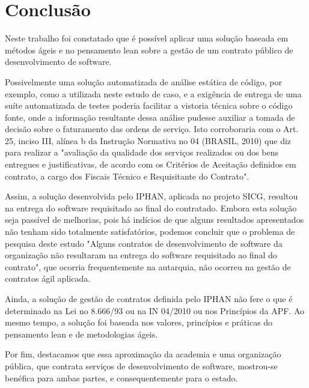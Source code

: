 \section{Conclusão}
\label{sec:conclusao}


Neste trabalho foi constatado que é possível aplicar uma solução baseada em métodos ágeis e no pensamento lean sobre a gestão de um contrato público de desenvolvimento de software.

Possivelmente uma solução automatizada de análise estática de código, por exemplo, como a utilizada neste estudo de caso, e a exigência de entrega de uma suíte automatizada de testes poderia facilitar a vistoria técnica sobre o
 código fonte, onde a informação resultante dessa análise pudesse auxiliar a tomada de
 decisão sobre o faturamento das ordens de serviço. Isto corroboraria com o Art. 25, inciso III, alínea b da Instrução Normativa no 04 (BRASIL, 2010) que diz para realizar a
 "avaliação da qualidade dos serviços realizados ou dos bens entregues e justificativas, de
 acordo com os Critérios de Aceitação definidos em contrato, a cargo dos Fiscais Técnico
 e Requisitante do Contrato".

Assim, a solução desenvolvida pelo IPHAN, aplicada no projeto SICG, resultou na
 entrega do software requisitado ao final do contratado. Embora esta solução seja passível
 de melhorias, pois há indícios de que alguns resultados apresentados não tenham sido
 totalmente satisfatórios, podemos concluir que o problema de pesquisa deste estudo "Alguns contratos de desenvolvimento de software da organização não resultaram na entrega
 do software requisitado ao final do contrato", que ocorria frequentemente na autarquia, não
 ocorreu na gestão de contratos ágil aplicada.

Ainda, a solução de gestão de contratos definida pelo
 IPHAN não fere o que é determinado na Lei no 8.666/93 ou na IN 04/2010 ou nos Princípios da APF. Ao mesmo tempo, a solução foi baseada nos valores, princípios e práticas
 do pensamento lean e de metodologias ágeis.
 
Por fim, destacamos que essa aproximação da academia e uma organização pública, que contrata serviços de desenvolvimento de software, mostrou-se benéfica para ambas partes, e consequentemente para o estado.